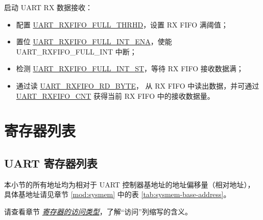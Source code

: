 \documentclass[main\_\_CN.tex]{subfiles}
\begin{document}
启动 UART RX 数据接收：
\begin{itemize}
    \item 配置 \hyperref[fielddesc:UARTRXFIFOFULLTHRHD]{UART\_RXFIFO\_FULL\_THRHD}，设置 RX FIFO 满阈值；
    \item 置位 \hyperref[fielddesc:UARTRXFIFOFULLINTENA]{UART\_RXFIFO\_FULL\_INT\_ENA}，使能 UART\_RXFIFO\_FULL\_INT 中断；
    \item 检测 \hyperref[fielddesc:UARTRXFIFOFULLINTST]{UART\_RXFIFO\_FULL\_INT\_ST}，等待 RX FIFO 接收数据满；
    \item 通过读 \hyperref[fielddesc:UARTRXFIFORDBYTE]{UART\_RXFIFO\_RD\_BYTE}， 从 RX FIFO 中读出数据，并可通过 \hyperref[fielddesc:UARTRXFIFOCNT]{UART\_RXFIFO\_CNT} 获得当前 RX FIFO 中的接收数据量。
\end{itemize}



\clearpage
\section{寄存器列表}
\label{sec:uart-reg-summ}
\hypertarget{uart-reg-summ}{}


\subsection{UART 寄存器列表}

本小节的所有地址均为相对于 UART 控制器基地址的地址偏移量（相对地址），具体基地址请见章节 \ref{mod:sysmem} \textit{} 中的表 \ref{tab:sysmem-base-address}。

请查看章节 \hyperref[glossary-access-types]{\textit{寄存器的访问类型}}，了解“访问”列缩写的含义。




\end{document}
